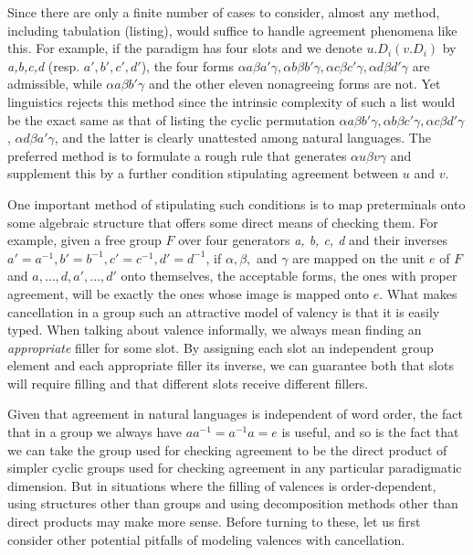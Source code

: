 Since there are only a finite number of cases to consider, almost any method,
including tabulation (listing), would suffice to handle agreement phenomena
like this. For example, if the paradigm has four slots and we denote $u.D_i
(v.D_i)$ by {\it a,b,c,d} (resp. $a',b',c',d'$), the four forms $\alpha a
\beta a' \gamma, \alpha b \beta b' \gamma, \alpha c \beta c' \gamma, \alpha d
\beta d' \gamma$ are admissible, while $\alpha a \beta b' \gamma$ and the
other eleven nonagreeing forms are not. Yet linguistics rejects this method
since the intrinsic complexity of such a list would be the exact same as that
of listing the cyclic permutation $\alpha a \beta b' \gamma, \alpha b \beta c'
\gamma, \alpha c \beta d' \gamma$, $\alpha d \beta a' \gamma$, and the latter
is clearly unattested among natural languages. The preferred method is to
formulate a rough rule that generates $\alpha u \beta v \gamma$ and supplement
this by a further condition stipulating agreement between $u$ and $v$. 

One important method of stipulating such conditions is to map preterminals
onto some algebraic structure that offers some direct means of checking them.
For example, given a free group $F$ over four generators {\it a, b, c, d} and
their inverses $a'=a^{-1}, b'=b^{-1}, c'=c^{-1}, d'=d^{-1}$, if $\alpha,
\beta,$ and $\gamma$ are mapped on the unit $e$ of $F$ and
$a,\ldots,d,a',\ldots,d'$ onto themselves, the acceptable forms, the ones with
proper agreement, will be exactly the ones whose image is mapped onto $e$.
What makes cancellation in a group such an attractive model of valency is that
it is easily typed. When talking about valence informally, we always mean
finding an {\it appropriate} filler for some slot.  By assigning each slot an
independent group element and each appropriate filler its inverse, we can
guarantee both that slots will require filling and that different slots
receive different fillers. 

Given that agreement in natural languages is independent of word order, the
fact that in a group we always have $aa^{-1}=a^{-1}a=e$ is useful, and so is
the fact that we can take the group used for checking agreement to be the
direct product of simpler cyclic groups used for checking agreement in any
particular paradigmatic dimension. But in situations where the filling of
valences is order-dependent, using structures other than groups and using
decomposition methods other than direct products may make more sense. Before
turning to these, let us first consider other potential pitfalls of modeling
valences with cancellation. 

